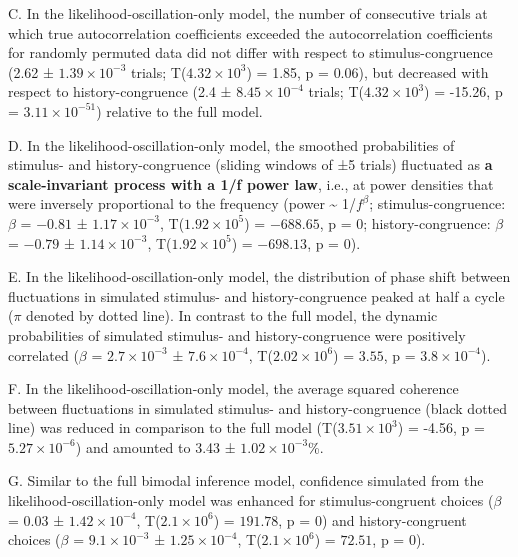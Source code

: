 \documentclass[
]{article}
\begin{document}
C. In the likelihood-oscillation-only model, the number of consecutive
trials at which true autocorrelation coefficients exceeded the
autocorrelation coefficients for randomly permuted data did not differ
with respect to stimulus-congruence (2.62 ±
\ensuremath{1.39\times 10^{-3}} trials;
T(\ensuremath{4.32\times 10^{3}}) = 1.85, p = \(0.06\)), but decreased
with respect to history-congruence (2.4 ±
\ensuremath{8.45\times 10^{-4}} trials;
T(\ensuremath{4.32\times 10^{3}}) = -15.26, p =
\(\ensuremath{3.11\times 10^{-51}}\)) relative to the full model.

D. In the likelihood-oscillation-only model, the smoothed probabilities
of stimulus- and history-congruence (sliding windows of ±5 trials)
fluctuated as \textbf{a scale-invariant process with a 1/f power law},
i.e., at power densities that were inversely proportional to the
frequency (power \textasciitilde{} 1/\(f^\beta\); stimulus-congruence:
\(\beta\) = \(-0.81\) ± \(\ensuremath{1.17\times 10^{-3}}\),
T(\(\ensuremath{1.92\times 10^{5}}\)) = \(-688.65\), p = \(0\);
history-congruence: \(\beta\) = \(-0.79\) ±
\(\ensuremath{1.14\times 10^{-3}}\),
T(\(\ensuremath{1.92\times 10^{5}}\)) = \(-698.13\), p = \(0\)).

E. In the likelihood-oscillation-only model, the distribution of phase
shift between fluctuations in simulated stimulus- and history-congruence
peaked at half a cycle (\(\pi\) denoted by dotted line). In contrast to
the full model, the dynamic probabilities of simulated stimulus- and
history-congruence were positively correlated (\(\beta\) =
\(\ensuremath{2.7\times 10^{-3}}\) ± \(\ensuremath{7.6\times 10^{-4}}\),
T(\(\ensuremath{2.02\times 10^{6}}\)) = \(3.55\), p =
\(\ensuremath{3.8\times 10^{-4}}\)).

F. In the likelihood-oscillation-only model, the average squared
coherence between fluctuations in simulated stimulus- and
history-congruence (black dotted line) was reduced in comparison to the
full model (T(\ensuremath{3.51\times 10^{3}}) = -4.56, p =
\(\ensuremath{5.27\times 10^{-6}}\)) and amounted to 3.43 ±
\ensuremath{1.02\times 10^{-3}}\%.

G. Similar to the full bimodal inference model, confidence simulated
from the likelihood-oscillation-only model was enhanced for
stimulus-congruent choices (\(\beta\) = \(0.03\) ±
\(\ensuremath{1.42\times 10^{-4}}\),
T(\(\ensuremath{2.1\times 10^{6}}\)) = \(191.78\), p = \(0\)) and
history-congruent choices (\(\beta\) =
\(\ensuremath{9.1\times 10^{-3}}\) ±
\(\ensuremath{1.25\times 10^{-4}}\),
T(\(\ensuremath{2.1\times 10^{6}}\)) = \(72.51\), p = \(0\)).
\end{document}
